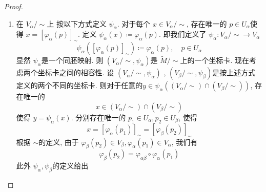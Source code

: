 \documentclass[../main.tex]{subfiles}
\begin{document}
\begin{proof}
\begin{enumerate}
\begin{enumerate}
\[      [O]_{\sim }=   [O\cap \tilde{M}]_{\sim }= [O\cap \left( \sqcup V_{\alpha } \right) ]_{\sim }= [\sqcup \left( O\cap V_{\alpha } \right) ]_{\sim }= : [ \sqcup  O_{\alpha }]_{\sim }= \bigcup _{\alpha }[O_{\alpha }]_{\sim }
        \]是 \(  \tilde{M}/\sim   \) 上的一个开集. 其中每个 \(  O_{\alpha }  \)都是 \(  V_{\alpha }  \)上的一个开集. 我们有 \[
         \varphi ^{-1} \left( [O]_{\sim } \right)= \bigcup _{ \alpha }  \varphi ^{-1} \left( [O_{\alpha }]_{\sim } \right)=\bigcup _{ \alpha } \varphi ^{-1} \left( [ \varphi _{\alpha } \left(  \varphi _{\alpha }^{-1} \left( O_{\alpha } \right)  \right) ] _{\sim }\right)= \bigcup _{\alpha } \varphi _{\alpha }^{-1} \left( O_{\alpha } \right)  
        \]  是 \(  M  \)上的一个开集. 故 \(   \varphi   \)是一个连续映射. 因此, \(   \varphi   \)是一个同肧映射. \(  \tilde{M}/ \sim   \)与 \(  M  \)同肧.
        \item 在 \(  V_{\alpha }/ \sim   \)上 按以下方式定义 \(  \psi _{\alpha }  \). 对于每个 \(  x \in V_{\alpha }/\sim   \), 存在唯一的 \(  p \in U_{\alpha }  \)使得 \(  x= [ \varphi _{\alpha }\left( p \right) ]_{\sim }  \).  定义 \(  \psi _{\alpha }\left( x \right)\coloneqq  \varphi _{\alpha }\left( p \right)    \). 即我们定义了 \(  \psi _{\alpha }: V_{\alpha }/\sim \to V_{\alpha }  \) \[
        \psi _{\alpha }\left( [ \varphi _{\alpha }\left( p \right) ]_{\sim } \right)\coloneqq  \varphi _{\alpha }\left( p \right)  ,\quad p \in U_{\alpha }
        \] 显然 \(  \psi _{\alpha }  \)是一个同胚映射. 则 \(  \left( V_{\alpha }/\sim , \psi _{\alpha } \right)   \)是 \(  \tilde{M}/\sim   \)上的一个坐标卡.  现在考虑两个坐标卡之间的相容性. 设 \(  \left( V_{\alpha }/ \sim ,\psi _{\alpha } \right)   \) , \(  \left( V_{\beta }/\sim , \psi _{\beta } \right)   \)是按上述方式定义的两个不同的坐标卡. 则对于任意的\(  y \in \psi _{\alpha }\left( \left( V_{\alpha }/\sim  \right)\cap \left( V_{\beta }/\sim  \right)   \right)   \), 存在唯一的  \[
        x \in \left( V_{\alpha }/\sim  \right)\cap \left( V_{\beta }/\sim  \right)  
        \]使得 \(  y= \psi _{\alpha }\left( x \right)   \).   分别存在唯一的 \(  p_1\in U_{\alpha }, p_2\in U_{\beta }  \), 使得 \[
        x= [ \varphi _{\alpha }\left( p_1 \right) ]_{\sim }= [ \varphi _{\beta  }\left( p_2 \right) ]_{\sim }
        \] 根据 \(  \sim   \)的定义, 由于 \(   \varphi _{\beta }\left( p_2 \right)\in V_{\beta },  \varphi _{\alpha }\left( p_1 \right)\in V_{\alpha }    \), 我们有   \[
         \varphi _{\beta }\left( p_2 \right)=  \varphi _{\alpha \beta }\circ  \varphi _{\alpha }\left( p_1 \right)  
        \] 此外 \(  \psi _{\alpha }, \psi _{\beta }  \)的定义给出  \[
\]
\end{enumerate}
\end{enumerate}
\end{proof}
\end{document}
